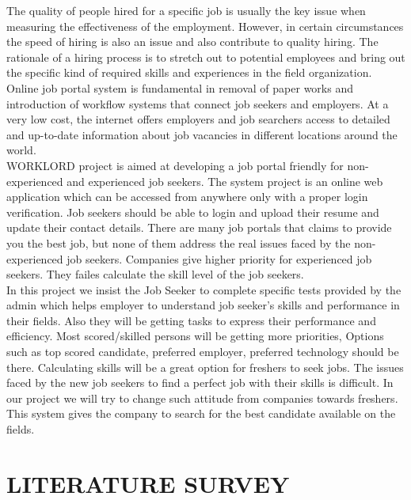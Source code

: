 \documentclass[a4paper,12pt]{report}
\begin{document}
\hspace*{12pt}The quality of people hired for a specific job is usually the key issue when measuring the effectiveness of the employment. However, in certain circumstances the speed of hiring is also an issue and also contribute to quality hiring. The rationale of a hiring process is to stretch out to potential employees and bring out the specific kind of required skills and experiences in the field organization. Online job portal system is fundamental in removal of paper works and introduction of workflow systems that connect job seekers and employers. At a very low cost, the internet offers employers and job searchers access to detailed and up-to-date information about job vacancies in different locations around the world. \\

WORKLORD project is aimed at developing a job portal friendly for non-experienced and experienced job seekers. The system project is an online web application which can be accessed from anywhere only with a proper login verification. Job seekers should be able to login and upload their resume and update their contact details. There are many job portals that claims to provide you the best job, but none of them address the real issues faced by the non-experienced job seekers. Companies give higher priority for experienced job seekers. They failes calculate the skill level of the job seekers. \\

 In this project we insist the Job Seeker to complete specific tests provided by the admin which helps employer to understand job seeker's skills and performance in their fields. Also they will be getting tasks to express their performance and efficiency. Most scored/skilled persons will be getting more priorities, Options such as top scored candidate, preferred employer, preferred technology should be there. Calculating skills will be a great option for freshers to seek jobs. The issues faced by the new job seekers to find a perfect job with their skills is difficult. In our project we will try to change such attitude from companies towards freshers. This system gives the company to search for the best candidate available on the fields.\\

\pagebreak

\chapter{LITERATURE SURVEY}
\end{document}
